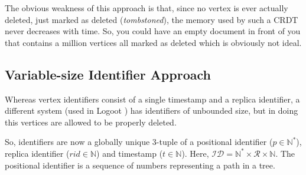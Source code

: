 \documentclass[diss.tex]{subfiles}
\begin{document}
The obvious weakness of this approach is that, since no vertex is ever actually deleted, just marked as deleted (\textit{tombstoned}), the memory used by such a CRDT never decreases with time. So, you could have an empty document in front of you that contains a million vertices all marked as deleted which is obviously not ideal.

\subsection{Variable-size Identifier Approach}
Whereas vertex identifiers consist of a single timestamp and a replica identifier, a different system (used in Logoot \cite{logoot}) has identifiers of unbounded size, but in doing this vertices are allowed to be properly deleted.

So, identifiers are now a globally unique 3-tuple of a positional identifier ($p \in \mathbb{N^*}$), replica identifier ($rid \in \mathbb{N}$) and timestamp ($t \in \mathbb{N}$). Here, $\mathcal{ID} = \mathbb{N^*} \times \mathcal{R} \times \mathbb{N} $. The positional identifier is a sequence of numbers representing a path in a tree.
\end{document}
